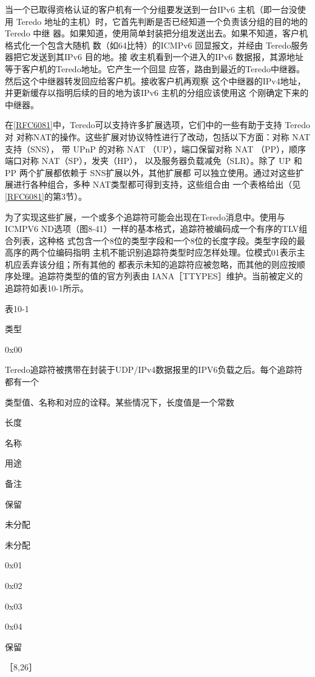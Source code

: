 当一个已取得资格认证的客户机有一个分组要发送到一台IPv6 主机（即一台没使用
Teredo 地址的主机）时，它首先判断是否已经知道一个负责该分组的目的地的Teredo 中继
器。如果知道，使用简单封装把分组发送出去。如果不知道，客户机格式化一个包含大随机
数（如64比特）的ICMPv6 回显报文，并经由 Teredo服务器把它发送到其IPv6 目的地。接
收主机看到一个进入的IPv6 数据报，其源地址等于客户机的Teredo地址。它产生一个回显
应答，路由到最近的Teredo中继器。然后这个中继器转发回应给客户机。接收客户机再观察
这个中继器的IPv4地址，并更新缓存以指明后续的目的地为该IPv6 主机的分组应该使用这
个刚确定下来的中继器。

在\href{https://www.rfc-editor.org/rfc/rfc6081}{[RFC6081]}中，Teredo可以支持许多扩展选项，它们中的一些有助于支持 Teredo对
对称NAT的操作。这些扩展对协议特性进行了改动，包括以下方面：对称 NAT 支持（SNS），
带 UPnP 的对称 NAT （UP），端口保留对称 NAT （PP），顺序端口对称 NAT（SP），发夹（HP），
以及服务器负载减免（SLR）。除了 UP 和PP 两个扩展都依赖于 SNS扩展以外，其他扩展都
可以独立使用。通过对这些扩展进行各种组合，多种 NAT类型都可得到支持，这些组合由
一个表格给出（见\href{https://www.rfc-editor.org/rfc/rfc6081}{[RFC6081]}的第3节）。

为了实现这些扩展，一个或多个追踪符可能会出现在Teredo消息中。使用与ICMPV6
ND选项（图8-41）一样的基本格式，追踪符被编码成一个有序的TLV组合列表，这种格
式包含一个8位的类型字段和一个8位的长度字段。类型字段的最高序的两个位编码指明
主机不能识别追踪符类型时应怎样处理。位模式01表示主机应丢弃该分组；所有其他的
都表示未知的追踪符应被忽略，而其他的则应按顺序处理。追踪符类型的值的官方列表由
IANA［TTYPES］维护。当前被定义的追踪符如表10-1所示。

表10-1

类型

0x00

Teredo追踪符被携带在封装于UDP/IPv4数据报里的IPV6负载之后。每个追踪符都有一个

类型值、名称和对应的诠释。某些情况下，长度值是一个常数

长度

名称

用途

备注

保留

未分配

未分配

0x01

0x02

0x03

0x04

保留

［8,26］

